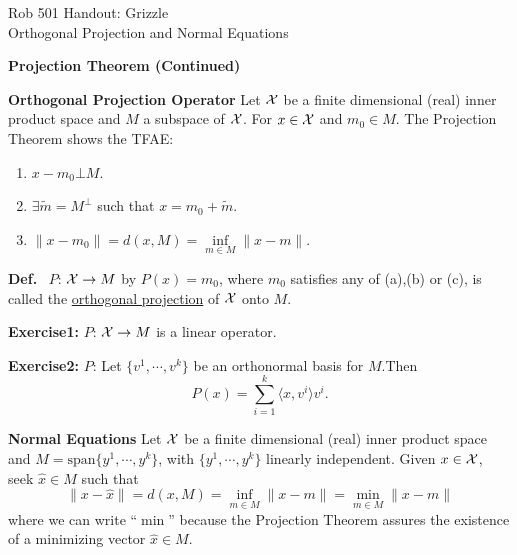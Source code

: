 \documentclass[letterpaper]{article}
\begin{document}
\baselineskip=48pt  %


\setlength{\parskip}{.3in}
\setlength{\itemsep}{.3in}

\pagestyle{plain}

{\Large \bf
\begin{center}
Rob 501 Handout: Grizzle \\ 
Orthogonal Projection and Normal Equations
\end{center}
}



\Large

\begin{center}
\textbf{Projection Theorem (Continued)}
\end{center}

\noindent \textbf{Orthogonal Projection Operator}
\newline
Let $\cal X$ be a finite dimensional (real) inner product space and $M$ a subspace of $\cal X$. For $x \in \cal X$ and $m_0 \in M$. The Projection Theorem shows the TFAE:
\renewcommand{\labelenumi}{(\alph{enumi})}
\begin{enumerate}
    \item $x-m_0  \bot M $.

    \item $\exists \tilde{m} = M^{\bot}$ such that  $ x=m_0 + \tilde{m} $.

    \item $ \|x-m_0\|=d(x,M)=\inf\limits_{m \in M} \|x-m\|$.
\end{enumerate}
\noindent \textbf{Def.}~ $P$: ${\cal X}\rightarrow M$ by $P(x)=m_0$, where $m_0$ satisfies any of (a),(b) or (c), is called the \underline{orthogonal projection} of $\cal X$ onto $M$.

\noindent \textbf{Exercise1:}
$P$: ${\cal X}\rightarrow M$ is a linear operator.

\noindent \textbf{Exercise2:}
$P$: Let $\{v^1,\cdots ,v^k\}$ be an orthonormal basis for $M$.Then
$$P(x)= \sum\limits_{i=1}^k  \langle x,v^i \rangle  v^i.$$

\newpage

\noindent \textbf{Normal Equations}
\newline
Let $\cal X$ be a finite dimensional (real) inner product space and $M=\mathrm{span}\{y^1,\cdots ,y^k\}$, with $\{y^1,\cdots ,y^k\}$ linearly independent. Given $x \in \cal X$, seek $\hat{x} \in M$ such that
$$\|x-\hat{x} \|= d(x,M)=\inf_{m \in M} \|x-m\|= \min_{m \in M} \|x-m\|$$
where we can write ``$\min$'' because the Projection Theorem assures the existence of a minimizing vector $\hat{x} \in M$.
\end{document}
